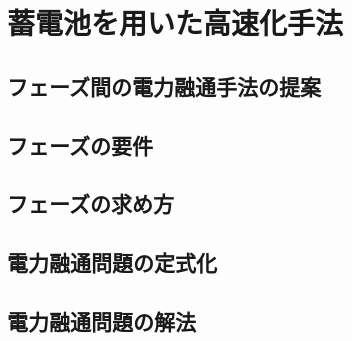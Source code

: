 \chapter{蓄電池を用いた高速化手法}
\label{chap:proposal}



\section{フェーズ間の電力融通手法の提案}
\label{sec:curb}


\section{フェーズの要件}
\label{sec:phase}


\section{フェーズの求め方}
\label{sec:phase}


\section{電力融通問題の定式化}
\label{sec:formularization}


\section{電力融通問題の解法}
\label{sec:algorithm}


